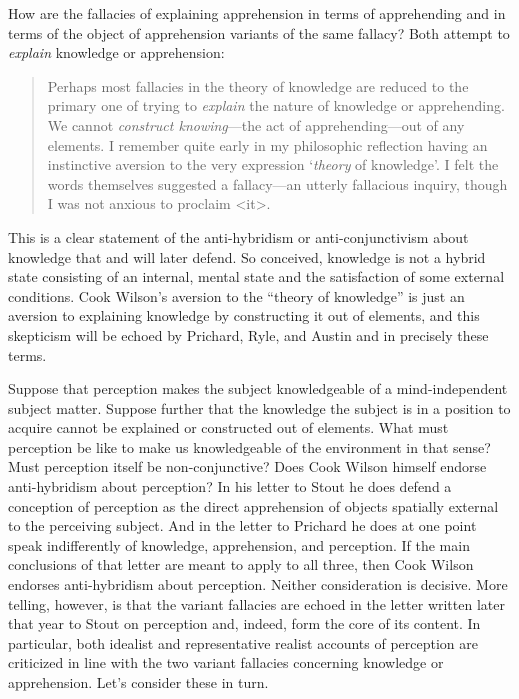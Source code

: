 How are the fallacies of explaining apprehension in terms of apprehending and in terms of the object of apprehension variants of the same fallacy? Both attempt to \emph{explain} knowledge or apprehension:
\begin{quote}
	Perhaps most fallacies in the theory of knowledge are reduced to the primary one of trying to \emph{explain} the nature of knowledge or apprehending. We cannot \emph{construct knowing}---the act of apprehending---out of any elements. I remember quite early in my philosophic reflection having an instinctive aversion to the very expression `\emph{theory} of knowledge'. I felt the words themselves suggested a fallacy---an utterly fallacious inquiry, though I was not anxious to proclaim <it>. \citep[803]{Cook-Wilson:1926sf}
\end{quote}
This is a clear statement of the anti-hybridism or anti-conjunctivism about knowledge that \citet{McDowell:1982kx} and \citet{Williamson:2000lr} will later defend. So conceived, knowledge is not a hybrid state consisting of an internal, mental state and the satisfaction of some external conditions. Cook Wilson's aversion to the ``theory of knowledge'' is just an aversion to explaining knowledge by constructing it out of elements, and this skepticism will be echoed by Prichard, Ryle, and Austin and in precisely these terms.

Suppose that perception makes the subject knowledgeable of a mind-independent subject matter. Suppose further that the knowledge the subject is in a position to acquire cannot be explained or constructed out of elements. What must perception be like to make us knowledgeable of the environment in that sense? Must perception itself be non-conjunctive? Does Cook Wilson himself endorse anti-hybridism about perception? In his letter to Stout he does defend a conception of perception as the direct apprehension of objects spatially external to the perceiving subject. And in the letter to Prichard he does at one point speak indifferently of knowledge, apprehension, and perception. If the main conclusions of that letter are meant to apply to all three, then Cook Wilson endorses anti-hybridism about perception. Neither consideration is decisive. More telling, however, is that the variant fallacies are echoed in the letter written later that year to Stout on perception and, indeed, form the core of its content. In particular, both idealist and representative realist accounts of perception are criticized in line with the two variant fallacies concerning knowledge or apprehension. Let's consider these in turn.

